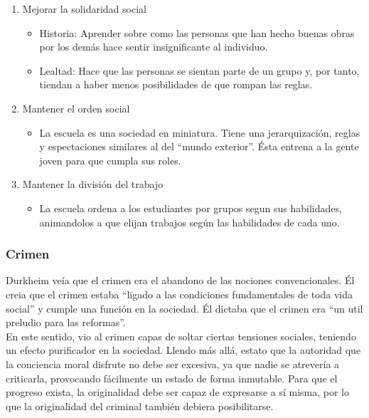 \begin{enumerate}
	\item Mejorar la solidaridad social
	\begin{itemize}
		\item Historia: Aprender sobre como las personas que han hecho buenas obras por los dem\'as hace sentir insignificante al individuo. 
	 	
          	\item Lealtad: Hace que las personas se sientan parte de un grupo y, por tanto, tiendan a haber menos posibilidades de que rompan las reglas.
	\end{itemize}
	\item Mantener el orden social
	\begin{itemize}
		\item La escuela es una sociedad en miniatura. Tiene una jerarquizaci\'on, reglas y espectaciones similares al del ``mundo exterior''. \'Esta entrena a la gente joven para que cumpla sus roles.
	\end{itemize}
	\item Mantener la divisi\'on del trabajo
	\begin{itemize}
		\item La escuela ordena a los estudiantes por grupos segun sus habilidades, animandolos a que elijan trabajos seg\'un las habilidades de cada uno.
	\end{itemize}
\end{enumerate}

\subsubsection{Crimen}
Durkheim ve\'ia que el crimen era el abandono de las nociones convencionales.
\'El creia que el crimen estaba ``ligado a las condiciones fundamentales de toda vida social'' y cumple una funci\'on en la sociedad.
\'El dictaba que el crimen era ``un util preludio para las reformas''.\\
En este sentido, vio al crimen capas de soltar ciertas tensiones sociales, teniendo un efecto purificador en la sociedad.
Llendo m\'as all\'a, estato que la autoridad que la conciencia moral disfrute no debe ser excesiva, ya que nadie se atrever\'ia a criticarla, provocando f\'acilmente un estado de forma inmutable.
Para que el progreso exista, la originalidad debe ser capaz de expresarse a s\'i misma, por lo que la originalidad del criminal tambi\'en debiera posibilitarse.

